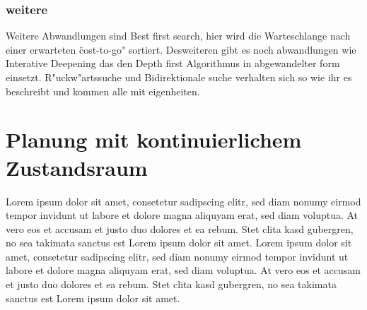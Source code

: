 \subsubsection{weitere}
Weitere Abwandlungen sind Best first search, hier wird die Warteschlange nach einer erwarteten \"cost-to-go" sortiert. 
Desweiteren gibt es noch abwandlungen wie Interative Deepening das den Depth first Algorithmus in abgewandelter form einsetzt. 
R"uckw"artssuche und Bidirektionale suche verhalten sich so wie ihr es beschreibt und kommen alle mit eigenheiten. 


\section{Planung mit kontinuierlichem Zustandsraum}
Lorem ipsum dolor sit amet, consetetur sadipscing elitr, sed diam nonumy eirmod tempor invidunt ut labore et dolore magna aliquyam erat, sed diam voluptua. At vero eos et accusam et justo duo dolores et ea rebum. Stet clita kasd gubergren, no sea takimata sanctus est Lorem ipsum dolor sit amet. Lorem ipsum dolor sit amet, consetetur sadipscing elitr, sed diam nonumy eirmod tempor invidunt ut labore et dolore magna aliquyam erat, sed diam voluptua. At vero eos et accusam et justo duo dolores et ea rebum. Stet clita kasd gubergren, no sea takimata sanctus est Lorem ipsum dolor sit amet.

